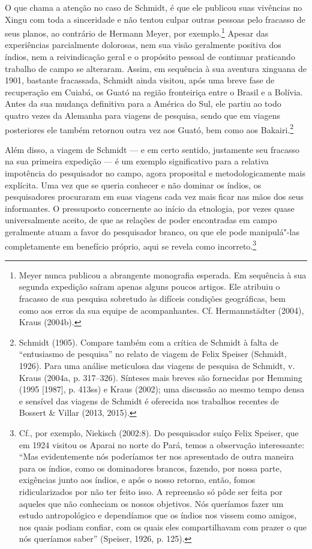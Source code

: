 O que chama a atenção no caso de Schmidt, é que ele publicou suas
vivências no Xingu com toda a sinceridade e não tentou culpar outras
pessoas pelo fracasso de seus planos, ao contrário de Hermann Meyer, por
exemplo.\footnote{Meyer nunca publicou a abrangente monografia esperada.
  Em sequência à sua segunda expedição saíram apenas alguns poucos
  artigos. Ele atribuiu o fracasso de sua pesquisa sobretudo às
  difíceis condições geográficas, bem como aos erros da sua equipe de
  acompanhantes. Cf. Hermannstädter (2004), Kraus (2004b).} Apesar das
experiências parcialmente dolorosas, nem sua visão geralmente positiva
dos índios, nem a reivindicação geral e o propósito pessoal de
continuar praticando trabalho de campo se alteraram. Assim, em
sequência à sua aventura xinguana de 1901, bastante fracassada, Schmidt
ainda visitou, após uma breve fase de recuperação em Cuiabá, os Guató na
região fronteiriça entre o Brasil e a Bolívia. Antes da sua mudança
definitiva para a América do Sul, ele partiu ao todo quatro vezes da
Alemanha para viagens de pesquisa, sendo que em viagens posteriores ele
também retornou outra vez aos Guató, bem como aos Bakairi.\footnote{Schmidt
  (1905). Compare também com a crítica de Schmidt à falta de
  ``entusiasmo de pesquisa'' no relato de viagem de Felix Speiser
  (Schmidt, 1926). Para uma análise meticulosa das viagens de pesquisa
  de Schmidt, v. Kraus (2004a, p. 317--326). Sínteses mais breves são
  fornecidas por Hemming (1995 {[}1987{]}, p. 413ss) e Kraus (2002); uma
  discussão ao mesmo tempo densa e sensível das viagens de Schmidt é
  oferecida nos trabalhos recentes de Bossert \& Villar (2013, 2015).}

Além disso, a viagem de Schmidt --- e em certo sentido, justamente seu
fracasso na sua primeira expedição --- é um exemplo significativo para a
relativa impotência do pesquisador no campo, agora proposital e
metodologicamente mais explícita. Uma vez que se queria conhecer e não
dominar os índios, os pesquisadores procuraram em suas viagens cada vez
mais ficar nas mãos dos seus informantes. O pressuposto concernente ao
início da etnologia, por vezes quase universalmente aceito, de que as
relações de poder encontradas em campo geralmente atuam a favor do
pesquisador branco, ou que ele pode manipulá"-las completamente em
benefício próprio, aqui se revela como incorreto.\footnote{Cf., por
  exemplo, Niekisch (2002:8). Do pesquisador suíço Felix Speiser, que em
  1924 visitou os Aparai no norte do Pará, temos a observação
  interessante: ``Mas evidentemente nós poderíamos ter nos apresentado
  de outra maneira para os índios, como os dominadores brancos, fazendo,
  por nossa parte, exigências junto aos índios, e após o nosso retorno,
  então, fomos ridicularizados por não ter feito isso. A repreensão só
  pôde ser feita por aqueles que não conheciam os nossos objetivos. Nós
  queríamos fazer um estudo antropológico e dependíamos que os índios
  nos vissem como amigos, nos quais podiam confiar, com os quais eles
  compartilhavam com prazer o que nós queríamos saber'' (Speiser, 1926,
  p. 125).}

